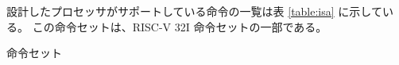 \documentclass[../specifications.tex]{subfiles}
\begin{document}
  設計したプロセッサがサポートしている命令の一覧は表 \ref{table:isa} に示している。
  この命令セットは、RISC-V 32I 命令セットの一部である。

  \begin{table}
    \centering
    \caption{命令セット}
    \label{table:isa}
  \end{table}
  
\end{document}

